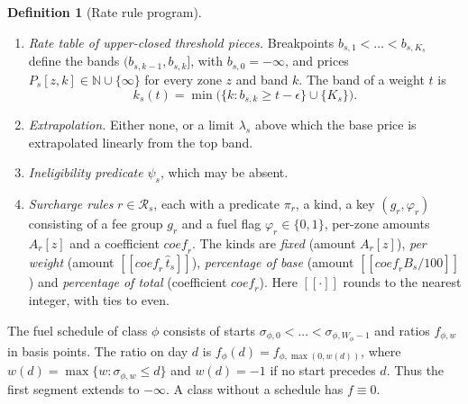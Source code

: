 \documentclass[11pt]{article}
\theoremstyle{definition}
\newtheorem{definition}[theorem]{Definition}
\theoremstyle{remark}
\newcommand{\rnd}[1]{\llbracket #1 \rrbracket}
\providecommand{\llbracket}{[\![}
\providecommand{\rrbracket}{]\!]}
\begin{document}
\begin{definition}[Rate rule program]
\begin{enumerate}[label=(\roman*),leftmargin=*]
$T=t$. The result is the \emph{effective weight} $\hat t_s(x)$.
\item \emph{Rate table of upper-closed threshold pieces.} Breakpoints
$b_{s,1}<\dots<b_{s,K_s}$ define the bands $(b_{s,k-1},b_{s,k}]$, with $b_{s,0}=-\infty$, and
prices $P_s[z,k]\in\mathbb N\cup\{\infty\}$ for every zone $z$ and band $k$. The band of a
weight $t$ is
\[
k_s(t)=\min\bigl(\{k:b_{s,k}\ge t-\epsilon\}\cup\{K_s\}\bigr).
\]
\item \emph{Extrapolation.} Either none, or a limit $\lambda_s$ above which the base price
is extrapolated linearly from the top band.
\item \emph{Ineligibility predicate} $\psi_s$, which may be absent.
\item \emph{Surcharge rules} $r\in\mathcal R_s$, each with a predicate $\pi_r$, a kind, a key
$(g_r,\varphi_r)$ consisting of a fee group $g_r$ and a fuel flag $\varphi_r\in\{0,1\}$,
per-zone amounts $A_r[z]$ and a coefficient $\mathit{coef}_r$. The kinds are \emph{fixed}
(amount $A_r[z]$), \emph{per weight} (amount $\rnd{\mathit{coef}_r\,\hat t_s}$),
\emph{percentage of base} (amount $\rnd{\mathit{coef}_r B_s/100}$) and \emph{percentage of
total} (coefficient $\mathit{coef}_r$). Here $\rnd{\cdot}$ rounds to the nearest integer, with
ties to even.
\end{enumerate}
\end{definition}

The fuel schedule of class $\phi$ consists of starts $\sigma_{\phi,0}<\dots<\sigma_{\phi,W_\phi-1}$
and ratios $f_{\phi,w}$ in basis points. The ratio on day $d$ is
$f_\phi(d)=f_{\phi,\max(0,w(d))}$, where $w(d)=\max\{w:\sigma_{\phi,w}\le d\}$ and $w(d)=-1$ if
no start precedes $d$. Thus the first segment extends to $-\infty$. A class without a
schedule has $f\equiv 0$.
\end{document}
